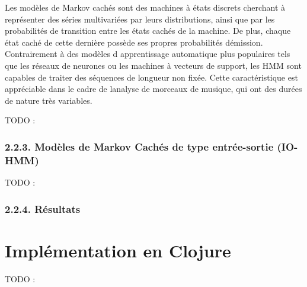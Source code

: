 \documentclass[letterpaper]{article}
\begin{document}
Les modèles de Markov cachés sont des machines à états discrets cherchant à représenter des séries multivariées par
leurs distributions, ainsi que par les probabilités de transition entre les états cachés de la machine. De plus, chaque état
caché de cette dernière possède ses propres probabilités d\textquotesingle émission. Contrairement à des modèles d\textquotesingle
apprentissage automatique plus populaires tels que les réseaux de neurones ou les machines à vecteurs de support,
les HMM sont capables de traiter des séquences de longueur non fixée. Cette caractéristique est appréciable dans le cadre
de l\textquotesingle analyse de morceaux de musique, qui ont des durées de nature très variables.

TODO : \citep{JP} \citep{DR}

\subsubsection*{2.2.3. Modèles de Markov Cachés de type entrée-sortie (IO-HMM)}

TODO : \citep{YB}

\subsubsection*{2.2.4. Résultats}

\begin{table}[h]
\vskip 0.25cm
\caption{Évaluation des méthodes présentées selon différents indices :
ACC (accuracy), REL (relative keys), PAR (parallel keys) et OBF (out-by-a-fifth keys).
Le tableau reprend les scores du modèle cognitif (COGN), du modèle d\textquotesingle autocorrélation,
des modèles de Markov cachés (HMM), et du modèle de Markov caché d\textquotesingle entrée-sortie (IO-HMM).}
\end{table}

\section{Implémentation en Clojure}

TODO : \citep{SK}


\footnotesize


\end{document}
